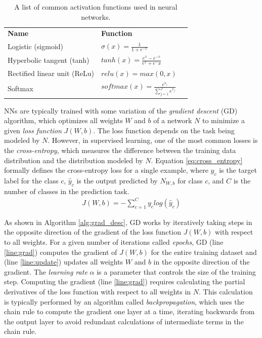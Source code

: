 \begin{table}[h]
    \centering
    \begin{tabular}{lll}
        \textbf{Name} & \textbf{Function} \\
        Logistic (sigmoid) & $\sigma(x) = \frac{1}{1 + e^{-x}}$ \\
        Hyperbolic tangent (tanh) & $tanh(x) = \frac{e^x - e^{-x}}{e^x + e^-x}$ \\
        Rectified linear unit (ReLu) & $relu(x) = max(0, x)$ \\
        Softmax & $softmax(x) = \frac{e^{x_i}}{\sum_{j=1}^{J} e^{x_j}}$ \\
    \end{tabular}
    \caption{A list of common activation functions used in neural networks.}
    \label{tab:activation}
\end{table}

NNs are typically trained with some variation of the \textit{gradient descent} (GD) algorithm, which optimizes all weights $W$ and $b$ of a network $N$ to minimize a given \textit{loss function} $J(W,b)$. The loss function depends on the task being modeled by $N$. However, in supervised learning, one of the most common losses is the \textit{cross-entropy}, which measures the difference between the training data distribution and the distribution modeled by $N$. Equation \ref{eq:cross_entropy} formally defines the cross-entropy loss for a single example, where $y_c$ is the target label for the class $c$, $\hat{y}_c$ is the output predicted by $N_{W,b}$ for class $c$, and $C$ is the number of classes in the prediction task.
\begin{equation} \label{eq:cross_entropy}
\begin{split}
    J(W,b) = -\sum_{c=1}^{C} y_clog(\hat{y}_c)
\end{split}
\end{equation}

As shown in Algorithm \ref{alg:grad_desc}, GD works by iteratively taking steps in the opposite direction of the gradient of the loss function $J(W,b)$ with respect to all weights. For a given number of iterations called \textit{epochs}, GD (line \ref{line:grad}) computes the gradient of $J(W,b)$ for the entire training dataset and (line \ref{line:update}) updates all weights $W$ and $b$ in the opposite direction of the gradient. The \textit{learning rate} $\alpha$ is a parameter that controls the size of the training step. Computing the gradient (line \ref{line:grad}) requires calculating the partial derivatives of the loss function with respect to all weights in $N$. This calculation is typically performed by an algorithm called \textit{backpropagation}, which uses the chain rule to compute the gradient one layer at a time, iterating backwards from the output layer to avoid redundant calculations of intermediate terms in the chain rule.

